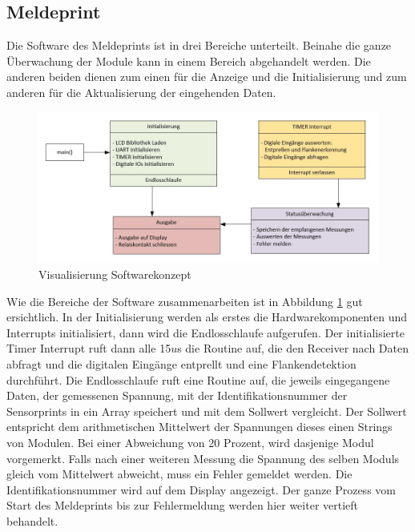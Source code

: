 
\subsection{Meldeprint}
Die Software des Meldeprints ist in drei Bereiche unterteilt. Beinahe die ganze Überwachung der Module kann in einem Bereich abgehandelt werden. Die anderen beiden dienen zum einen für die Anzeige und die Initialisierung und zum anderen für die Aktualisierung der eingehenden Daten.

\begin{figure}[htbp] 
  \centering
     \includegraphics[width=1\textwidth]{graphics/reportboard-software-river}
  \caption{Visualisierung Softwarekonzept}
  \label{fig:reportboard-software-river}
\end{figure}

Wie die Bereiche der Software zusammenarbeiten ist in Abbildung \ref{fig:reportboard-software-river} gut ersichtlich. In der Initialisierung werden als erstes die Hardwarekomponenten und Interrupts initialisiert, dann wird die Endlosschlaufe aufgerufen.
\newline
Der initialisierte Timer Interrupt ruft dann alle 15$u$s die Routine auf, die den Receiver nach Daten abfragt und die digitalen Eingänge entprellt und eine Flankendetektion durchführt.
\newline
Die Endlosschlaufe ruft eine Routine auf, die jeweils eingegangene Daten, der gemessenen Spannung, mit der Identifikationsnummer der Sensorprints in ein Array speichert und mit dem Sollwert vergleicht. Der Sollwert entspricht dem arithmetischen Mittelwert der Spannungen dieses einen Strings von Modulen. Bei einer Abweichung von 20 Prozent, wird dasjenige Modul vorgemerkt. Falls nach einer weiteren Messung die Spannung des selben Moduls gleich vom Mittelwert abweicht, muss ein Fehler gemeldet werden. Die Identifikationsnummer wird auf dem Display angezeigt. Der ganze Prozess vom Start des Meldeprints bis zur Fehlermeldung werden hier weiter vertieft behandelt.

